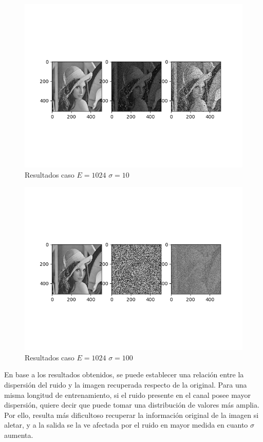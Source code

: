 \begin{figure}[h!]
\includegraphics[scale=0.9]{Imagenes/E1024S10}
\centering
\caption{Resultados caso $E=1024$ $\sigma = 10$ }
\end{figure}

\begin{figure}[h!]
\includegraphics[scale=0.9]{Imagenes/E1024S100}
\centering
\caption{Resultados caso $E=1024$ $\sigma = 100$ }
\end{figure}

\newpage
En base a los resultados obtenidos, se puede establecer una relaci\'on 
entre la dispersi\'on del ruido y la imagen recuperada respecto de la original. Para una misma longitud de entrenamiento, si el ruido presente en el canal posee mayor dispersi\'on, quiere decir que puede tomar una distribuci\'on de valores m\'as amplia. Por ello, resulta m\'as dificultoso recuperar la informaci\'on original de la imagen si aletar, y a la salida se la ve afectada por el ruido en mayor medida en cuanto $\sigma$ aumenta.

